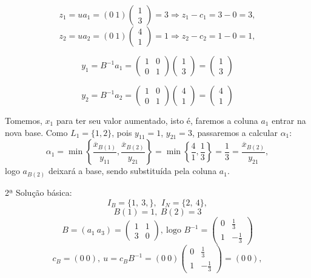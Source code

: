 \documentclass[12pt]{exam}
\begin{document}
\begin{questions}
\begin{solution}
	$$z_1 = ua_1 = (0~1)\begin{pmatrix}
	1 \\ 
	3 
	\end{pmatrix} = 3 \Rightarrow z_1 - c_1 = 3 - 0 =3,$$
	$$z_2 = ua_2 = (0~1)\begin{pmatrix}
	4 \\ 
	1 
	\end{pmatrix} = 1 \Rightarrow z_2 - c_2 = 1 - 0 = 1,$$

	$$y_1 = B^{-1}a_1 = \begin{pmatrix}
	 1 & 0 \\ 
	 0 & 1
	\end{pmatrix} \begin{pmatrix}
	1 \\ 
	3 
	\end{pmatrix}=  \begin{pmatrix}
	1 \\ 
	3
	\end{pmatrix} $$

	$$y_2 = B^{-1}a_2 = \begin{pmatrix}
	 1 & 0 \\ 
	 0 & 1
	\end{pmatrix} \begin{pmatrix}
	4 \\ 
	1
	\end{pmatrix}=  \begin{pmatrix}
	4 \\ 
	1
	\end{pmatrix} $$

Tomemos, $x_1$ para ter seu valor aumentado, isto é, faremos a coluna $a_1$ entrar na nova base. Como $L_1 = \{1, 2\}$, pois $y_{11} = 1$, $y_{21} = 3$, passaremos a calcular $\alpha_1$:
$$\alpha_1 = \min\left\lbrace\frac{\overline{x}_{B(1)}}{y_{11}},\frac{\overline{x}_{B(2)}}{y_{21}}\right\rbrace  = \min\left\lbrace\frac{4}{1}, \frac{1}{3} \right\rbrace = \frac{1}{3} = \frac{\overline{x}_{B(2)}}{y_{21}},$$
logo $a_{B(2)}$ deixará a base, sendo substituída pela coluna $a_1$.

2ª Solução básica:
	$$I_B = \{1,~3,\},~~I_N = \{2,~4\},$$
	$$B(1) = 1,~ B(2) = 3$$
	$$B = (a_1~a_3) =\begin{pmatrix}
	1 & 1 \\
	3 & 0
	\end{pmatrix},~\text{logo } B^{-1} = \begin{pmatrix}
	0 & \frac{1}{3} \\
	1 & -\frac{1}{3}
	\end{pmatrix} $$
	$$c_B = (0~0),~u = c_BB^{-1} = (0~0)\begin{pmatrix}
	0 & \frac{1}{3} \\
	1 & -\frac{1}{3}
	\end{pmatrix} = (0~0),$$
	

\end{solution}
\end{questions}
\end{document}
